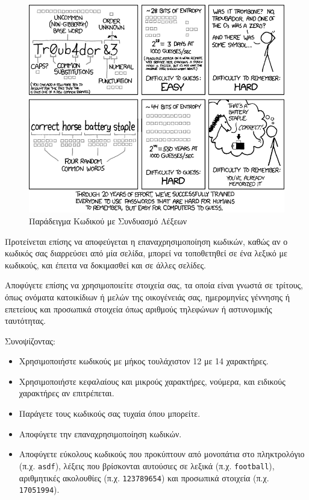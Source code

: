 \documentclass[11pt]{article}
\begin{document}
\begin{figure}[h]
    \centering
    \includegraphics[width=\textwidth]{password_strength}
    \caption{Παράδειγμα Κωδικού με Συνδυασμό Λέξεων \label{fig:xkcd_password_strngth}}
\end{figure}

Προτείνεται επίσης να αποφεύγεται η επαναχρησιμοποίηση κωδικών, καθώς αν ο κωδικός σας διαρρεύσει από μία σελίδα, μπορεί να τοποθετηθεί σε ένα λεξικό με κωδικούς, και έπειτα να δοκιμασθεί και σε άλλες σελίδες.

Αποφύγετε επίσης να χρησιμοποιείτε στοιχεία σας, τα οποία είναι γνωστά σε τρίτους, όπως ονόματα κατοικίδιων ή μελών της οικογένειάς σας, ημερομηνίες γέννησης ή επετείους και προσωπικά στοιχεία όπως αριθμούς τηλεφώνων ή αστυνομικής ταυτότητας.

Συνοψίζοντας:

\begin{itemize}
    \item Χρησιμοποιήστε κωδικούς με μήκος τουλάχιστον 12 με 14 χαρακτήρες.
    \item Χρησιμοποιήστε κεφαλαίους και μικρούς χαρακτήρες, νούμερα, και ειδικούς χαρακτήρες αν επιτρέπεται.
    \item Παράγετε τους κωδικούς σας τυχαία όπου μπορείτε.
    \item Αποφύγετε την επαναχρησιμοποίηση κωδικών.
    \item Αποφύγετε εύκολους κωδικούς που προκύπτουν από μονοπάτια στο πληκτρολόγιο (π.χ. \texttt{asdf}), λέξεις που βρίσκονται αυτούσιες σε λεξικά (π.χ. \texttt{football}), αριθμητικές ακολουθίες (π.χ. \texttt{123789654}) και προσωπικά στοιχεία (π.χ. \texttt{17051994}).
\end{itemize}

\printbibliography[heading=bibintoc]
\end{document}
